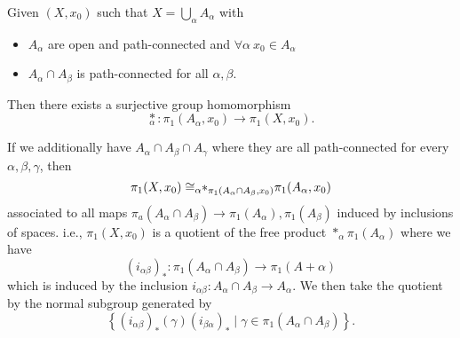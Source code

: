 \begin{theorem}\label{thm:Seifert-Van-Kampen-Theorem}
	Given \((X, x_0)\) such that \(X = \bigcup\limits_{\alpha } A_{\alpha }\) with
	\begin{itemize}
		\item \(A_{\alpha }\) are open and path-connected and \(\forall \alpha \ x_0\in A_{\alpha }\)
		\item \(A_{\alpha }\cap A_{\beta }\) is path-connected for all \(\alpha, \beta  \).
	\end{itemize}
	Then there exists a surjective group homomorphism
	\[
		\underset{\alpha }{\ast}\colon \pi _1(A_{\alpha }, x_0)\to \pi _1(X, x_0).
	\]

	\par If we additionally have \(A_{\alpha }\cap A_{\beta}\cap A_{\gamma}\) where they are all path-connected for every \(\alpha , \beta , \gamma\), then
	\[
		\pi _1(X, x_0)\cong _{\alpha }\hspace{-0.3em}\ast_{\pi _1(A_{\alpha }\cap A_{\beta }, x_0)}{}\pi _1(A_{\alpha }, x_0)
	\]
	associated to all maps \(\pi _a(A_{\alpha }\cap A_{\beta }) \to \pi _1 (A_{\alpha }), \pi _1(A_{\beta })\) induced by inclusions of spaces. i.e., \(\pi _1(X, x_0)\)
	is a quotient of the free product \(\ast_{\alpha}\pi _1(A_{\alpha })\) where we have
	\[
		(i_{\alpha \beta })_\ast\colon \pi _1(A_{\alpha }\cap A_{\beta })\to \pi _1(A+\alpha )
	\]
	which is induced by the inclusion \(i_{\alpha \beta }\colon A_{\alpha}\cap A_{\beta }\to A_{\alpha }\). We then take the quotient by the normal subgroup generated by
	\[
		\left\{(i_{\alpha \beta })_{\ast}(\gamma)(i_{\beta \alpha })_{\ast} \mid \gamma\in \pi _1(A_{\alpha }\cap A_{\beta })\right\}.
	\]
	\begin{figure}[H]
		\centering
		\label{fig:thm:Seifert-Van-Kampen-Theorem}
	\end{figure}
\end{theorem}

\begin{eg}

\end{eg}